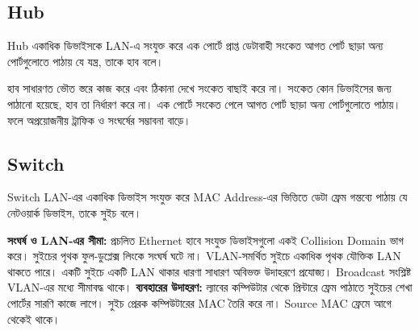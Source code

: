 \subsection{Hub}

\begin{definitionbox}{Hub}
একাধিক ডিভাইসকে LAN-এ সংযুক্ত করে এক পোর্টে প্রাপ্ত ডেটাবাহী সংকেত আগত পোর্ট ছাড়া অন্য পোর্টগুলোতে পাঠায় যে যন্ত্র, তাকে হাব বলে।
\end{definitionbox}

হাব সাধারণত ভৌত স্তরে কাজ করে এবং ঠিকানা দেখে সংকেত বাছাই করে না। সংকেত কোন ডিভাইসের জন্য পাঠানো হয়েছে, হাব তা নির্ধারণ করে না। এক পোর্টে সংকেত পেলে আগত পোর্ট ছাড়া অন্য পোর্টগুলোতে পাঠায়। ফলে অপ্রয়োজনীয় ট্রাফিক ও সংঘর্ষের সম্ভাবনা বাড়ে।



\subsection{Switch}

\begin{definitionbox}{Switch}
LAN-এর একাধিক ডিভাইস সংযুক্ত করে MAC Address-এর ভিত্তিতে ডেটা ফ্রেম গন্তব্যে পাঠায় যে নেটওয়ার্ক ডিভাইস, তাকে সুইচ বলে।
\end{definitionbox}


\textbf{সংঘর্ষ ও LAN-এর সীমা:} প্রচলিত Ethernet হাবে সংযুক্ত ডিভাইসগুলো একই Collision Domain ভাগ করে। সুইচের পৃথক ফুল-ডুপ্লেক্স লিংকে সংঘর্ষ ঘটে না। VLAN-সমর্থিত সুইচে একাধিক পৃথক যৌক্তিক LAN থাকতে পারে। একটি সুইচে একটি LAN থাকার ধারণা সাধারণ অবিভক্ত উদাহরণে প্রযোজ্য। Broadcast সংশ্লিষ্ট VLAN-এর মধ্যে সীমাবদ্ধ থাকে।
\textbf{ব্যবহারের উদাহরণ:} ল্যাবের কম্পিউটার থেকে প্রিন্টারে ফ্রেম পাঠাতে সুইচের শেখা পোর্টের সারণি কাজে লাগে। সুইচ প্রেরক কম্পিউটারের MAC তৈরি করে না। Source MAC ফ্রেমে আগে থেকেই থাকে।
